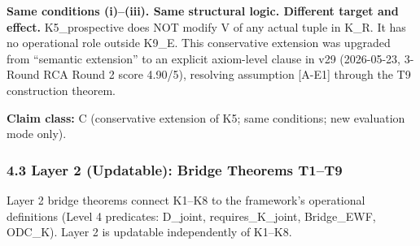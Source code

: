 \documentclass[
  11pt,
]{article}
\begin{document}
\textbf{Same conditions (i)--(iii). Same structural logic. Different
target and effect.} K5\_prospective does NOT modify V of any actual
tuple in K\_R. It has no operational role outside K9\_E. This
conservative extension was upgraded from ``semantic extension'' to an
explicit axiom-level clause in v29 (2026-05-23, 3-Round RCA Round 2
score 4.90/5), resolving assumption {[}A-E1{]} through the T9
construction theorem.

\textbf{Claim class:} C (conservative extension of K5; same conditions;
new evaluation mode only).

\subsubsection{4.3 Layer 2 (Updatable): Bridge Theorems
T1--T9}\label{layer-2-updatable-bridge-theorems-t1t9}

Layer 2 bridge theorems connect K1--K8 to the framework's operational
definitions (Level 4 predicates: D\_joint, requires\_K\_joint,
Bridge\_EWF, ODC\_K). Layer 2 is updatable independently of K1--K8.
\end{document}
